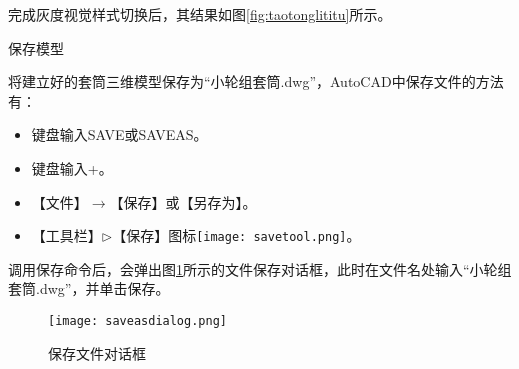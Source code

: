 \begin{procedure}
完成灰度视觉样式切换后，其结果如图\ref{fig:taotonglititu}所示。

\item 保存模型

将建立好的套筒三维模型保存为“小轮组套筒.dwg”，AutoCAD中保存文件的方法有：
\begin{itemize}
\item 键盘输入SAVE或SAVEAS。
\item 键盘输入+。
\item 【文件】$\rightarrow$【保存】或【另存为】。
\item 【工具栏】$\triangleright$【保存】图标\texttt{[image: savetool.png]}。
\end{itemize}

调用保存命令后，会弹出图\ref{fig:saveasdialog}所示的文件保存对话框，此时在文件名处输入“小轮组套筒.dwg”，并单击保存。
\begin{figure}[htbp]
\centering
\texttt{[image: saveasdialog.png]}
\caption{保存文件对话框}\label{fig:saveasdialog}
\end{figure}
\end{procedure}

\endinput